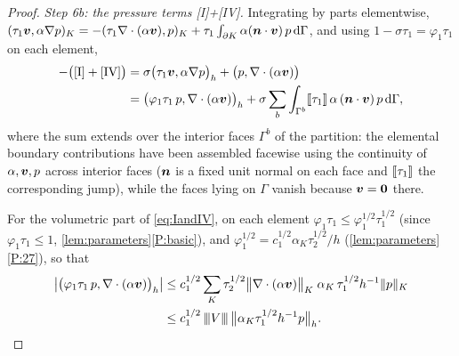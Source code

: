 \begin{proof}
\smallskip\noindent\emph{Step 6b: the pressure terms \textup{[I]+[IV]}.}
Integrating by parts elementwise, $(\tau_1\boldsymbol{v},\alpha\nabla p)_K
= -(\tau_1\nabla\cdot(\alpha\boldsymbol{v}),p)_K
+ \tau_{1}\int_{\partial K}\alpha(\boldsymbol{n}\cdot\boldsymbol{v})\,p\,\mathrm{d}\Gamma$, and using
$1-\sigma\tau_{1}=\varphi_{1}\tau_{1}$ on each element,
\begin{equation}\label{eq:IandIV}
\begin{aligned}
  -\bigl(\textup{[I]}+\textup{[IV]}\bigr)
  &= \sigma\bigl(\tau_1\boldsymbol{v},\alpha\nabla p\bigr)_h
  + \bigl(p,\nabla\cdot(\alpha\boldsymbol{v})\bigr) \\
  &= \bigl(\varphi_1\tau_1\,p,\nabla\cdot(\alpha\boldsymbol{v})\bigr)_h
  + \sigma\sum_{b}\int_{\Gamma^b}[\![\tau_1]\!]\,\alpha\,(\boldsymbol{n}\cdot\boldsymbol{v})\,p\,\mathrm{d}\Gamma,
\end{aligned}
\end{equation}
where the sum extends over the interior faces $\Gamma^b$ of the partition: the elemental
boundary contributions have been assembled facewise using the continuity of
$\alpha,\boldsymbol{v},p$ across interior faces ($\boldsymbol{n}$ is a fixed unit normal on each face and
$[\![\tau_1]\!]$ the corresponding jump), while the faces lying on $\Gamma$ vanish because
$\boldsymbol{v}=\boldsymbol{0}$ there.

For the volumetric part of \eqref{eq:IandIV}, on each element
$\varphi_1\tau_1\le\varphi_1^{1/2}\tau_1^{1/2}$
(since $\varphi_1\tau_1\le1$, \cref{lem:parameters}\ref{P:basic}), and
$\varphi_1^{1/2}=c_1^{1/2}\alpha_K\tau_2^{1/2}/h$
(\cref{lem:parameters}\ref{P:27}), so that
\begin{equation}\label{eq:volpart}
\begin{aligned}
  \bigl|\bigl(\varphi_1\tau_1\,p,\nabla\cdot(\alpha\boldsymbol{v})\bigr)_h\bigr|
  &\le c_1^{1/2}\sum_K
  \tau_2^{1/2}\bigl\lVert\nabla\cdot(\alpha\boldsymbol{v})\bigr\rVert_K\;
  \alpha_K\,\tau_1^{1/2}h^{-1}\lVert p\rVert_K \\
  &\le c_1^{1/2}\,{\lvert\kern-0.25ex\lvert\kern-0.25ex\lvert V \rvert\kern-0.25ex\rvert\kern-0.25ex\rvert}\,
  \bigl\lVert\alpha_K\tau_1^{1/2}h^{-1}p\bigr\rVert_h .
\end{aligned}
\end{equation}


\end{proof}
